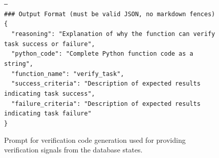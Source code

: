 \begin{figure}[t]
{\begin{minipage}{0.97\textwidth}
        \texttt{---}\\[3pt]
        \texttt{\#\#\# Output Format (must be valid JSON, no markdown fences)}\\
        \texttt{\{}\\
        \texttt{~~"reasoning": "Explanation of why the function can verify task success or failure",}\\
        \texttt{~~"python\_code": "Complete Python function code as a string",}\\
        \texttt{~~"function\_name": "verify\_task",}\\
        \texttt{~~"success\_criteria": "Description of expected results indicating task success",}\\
        \texttt{~~"failure\_criteria": "Description of expected results indicating task failure"}\\
        \texttt{\}}\\[3pt]

        \vspace{1pt}
        \end{minipage}
    }
    \captionsetup{labelformat=default, name=Table}
    \caption{Prompt for verification code generation used for providing verification signals from the database states.}
    \label{tab:verification-prompt-2}
\end{figure}
